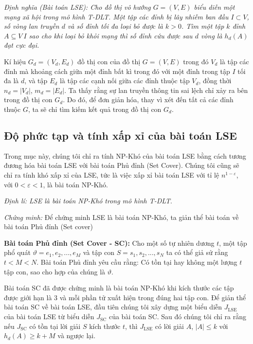  	{\itshape Định nghĩa (Bài toán LSE): Cho đồ thị vô hướng $G=(V,E)$ biểu diễn một mạng xã hội trong mô hình T-DLT. Một tập các đỉnh bị lây nhiễm ban đầu $I \subset V$, số vòng lan truyền $d$ và số đỉnh tối đa loại bỏ được là $k > 0$. Tìm một tập $k$ đỉnh  $A \subseteq V \ I$ sao cho khi loại bỏ khỏi mạng thì số đỉnh cứu được sau $d$ vòng là $h_{d}(A)$ đạt cực đại.}
 	
 	Kí hiệu $G_{d} = (V_{d}, E_{d})$ đồ thị con của đồ thị $G=(V, E)$ trong đó $V_{d}$ là tập các đỉnh mà khoảng cách giữa một đỉnh bất kì trong đó với một đỉnh trong tập $I$ tối đa là $d$, và tập $E_{d}$ là tập các cạnh nối giữa các đỉnh thuộc tập $V_{d}$, đồng thời $n_{d} = | V_{d} |$, $m_{d} = | E_{d} |$. Ta thấy rằng sự lan truyền thông tin sai lệch chỉ xảy ra bên trong đồ thị con $G_{d}$. Do đó, để đơn giản hóa, thay vì xét đến tất cả các đỉnh thuộc $G$, ta sẽ chỉ tìm kiếm kết quả trong đồ thị con $G_{d}$.
 	
 	\subsection{Độ phức tạp và tính xấp xỉ của bài toán LSE}
 	Trong mục này, chúng tôi chỉ ra tính NP-Khó của bài toán LSE bằng cách tương đương hóa bài toán LSE với bài toán Phủ đỉnh (Set Cover). Chúng tôi cũng sẽ chỉ ra tính khó xấp xỉ của LSE, tức là việc xấp xỉ bài toán LSE với tỉ lệ $n^{1 - \varepsilon}$, với $0 < \varepsilon < 1$, là bài toán NP-Khó.
 	
 	{\itshape Định lí: LSE là bài toán NP-Khó trong mô hình T-DLT}.
 	
 	{\itshape Chứng minh:} Để chứng minh LSE là bài toán NP-Khó, ta giản thể bài toán về bài toán Phủ đỉnh (Set cover) 
 	
 	{\bfseries Bài toán Phủ đỉnh (Set Cover - SC):} Cho một số tự nhiên dương $t$, một tập phổ quát $\vartheta = {e_{1}, e_{2}, ... ,e_{M}}$ và tập con $S = {s_{1}, s_{2}, ... , s_{N}}$ ta có thể giả sử rằng $t < M < N$. Bài toán Phủ đỉnh yêu cầu rằng: Có tồn tại hay không một lượng $t$ tập con, sao cho hợp của chúng là $\vartheta$.
 	
 	Bài toán SC đã được chứng minh là bài toán NP-Khó khi kích thước các tập được giới hạn là 3 và mỗi phần tử xuất hiện trong đúng hai tập con. Để giản thể bài toán SC về bài toán LSE, đầu tiên chúng tôi xây dựng một biểu diễn $J_{\text{LSE}}$ của bài toán LSE từ biểu diễn $J_{\text{SC}}$ của bài toán SC. Sau đó chúng tôi chỉ ra rằng nếu $J_{\text{SC}}$ có tồn tại lời giải $S$ kích thước $t$, thì $J_{\text{LSE}}$ có lời giải $A$, $| A | \leq k$ với $h_{d}(A) \geq k + M$ và ngược lại.
 	
